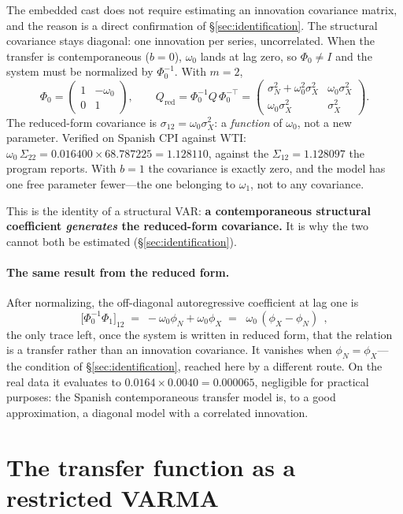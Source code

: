 \documentclass[11pt,a4paper]{article}
\theoremstyle{plain}
\theoremstyle{remark}
\begin{document}
The embedded cast does not require estimating an innovation covariance matrix, and
the reason is a direct confirmation of \S\ref{sec:identification}. The structural
covariance stays diagonal: one innovation per series, uncorrelated. When the
transfer is contemporaneous ($b=0$),
$\omega_0$ lands at lag zero, so $\Phi_0 \ne I$ and the system must be normalized by
$\Phi_0^{-1}$. With $m=2$,
\[
\Phi_0=\begin{pmatrix}1 & -\omega_0\\ 0 & 1\end{pmatrix},
\qquad
Q_{\text{red}}=\Phi_0^{-1}Q\,\Phi_0^{-\top}
=\begin{pmatrix}\sigma_N^2+\omega_0^2\sigma_X^2 & \omega_0\sigma_X^2\\[2pt]
                \omega_0\sigma_X^2 & \sigma_X^2\end{pmatrix}.
\]
The reduced-form covariance is $\sigma_{12}=\omega_0\sigma_X^2$: a \emph{function}
of $\omega_0$, not a new parameter. Verified on Spanish CPI against WTI:
$\omega_0\,\Sigma_{22}=0.016400\times 68.787225=1.128110$, against the
$\Sigma_{12}=1.128097$ the program reports. With $b=1$ the covariance is exactly
zero, and the model has one free parameter fewer---the one belonging to $\omega_1$,
not to any covariance.

This is the identity of a structural VAR: \textbf{a contemporaneous structural
coefficient \emph{generates} the reduced-form covariance.} It is why the two cannot
both be estimated (\S\ref{sec:identification}).

\paragraph{The same result from the reduced form.} After normalizing, the
off-diagonal autoregressive coefficient at lag one is
\[
\bigl[\Phi_0^{-1}\Phi_1\bigr]_{12}
 \;=\; -\omega_0\phi_N + \omega_0\phi_X
 \;=\; \boxed{\;\omega_0\,(\phi_X-\phi_N)\;}\,,
\]
the only trace left, once the system is written in reduced form, that the relation
is a transfer rather than an innovation covariance. It vanishes when
$\phi_N=\phi_X$---the condition of \S\ref{sec:identification}, reached here by a
different route. On the real data it evaluates to $0.0164\times 0.0040 = 0.000065$,
negligible for practical purposes: the Spanish contemporaneous transfer model is, to
a good approximation, a diagonal model with a correlated innovation.


\section{The transfer function as a restricted VARMA}
\label{sec:theory}
\end{document}
